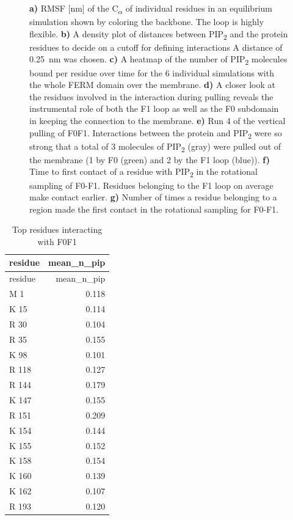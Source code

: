 \documentclass[
  twocolumn]{biophys-new-mod}
\begin{document}
\begin{figure}
\begin{minipage}[t]{0.50\linewidth}
{{}

}

\subcaption{\label{fig-f0f1-first-to-find}~}
\end{minipage}%

\caption{\label{fig-suppl}\textbf{a)} RMSF {[}nm{]} of the
C\textsubscript{\(\alpha\)} of individual residues in an equilibrium
simulation shown by coloring the backbone. The loop is highly flexible.
\textbf{b)} A density plot of distances between PIP\textsubscript{2} and
the protein residues to decide on a cutoff for defining interactions A
distance of 0.25~nm was chosen. \textbf{c)} A heatmap of the number of
PIP\textsubscript{2} molecules bound per residue over time for the 6
individual simulations with the whole FERM domain over the membrane.
\textbf{d)} A closer look at the residues involved in the interaction
during pulling reveals the instrumental role of both the F1 loop as well
as the F0 subdomain in keeping the connection to the membrane.
\textbf{e)} Run 4 of the vertical pulling of F0F1. Interactions between
the protein and PIP\textsubscript{2} were so strong that a total of 3
molecules of PIP\textsubscript{2} (gray) were pulled out of the membrane
(1 by F0 (green) and 2 by the F1 loop (blue)). \textbf{f)} Time to first
contact of a residue with PIP\textsubscript{2} in the rotational
sampling of F0-F1. Residues belonging to the F1 loop on average make
contact earlier. \textbf{g)} Number of times a residue belonging to a
region made the first contact in the rotational sampling for F0-F1.}

\end{figure}

\hypertarget{tbl-f0f1-top-interacting}{}
\begin{longtable}[]{@{}lr@{}}
\caption{\label{tbl-f0f1-top-interacting}Top residues interacting with
F0F1}\tabularnewline
\toprule()
residue & mean\_n\_pip \\
\midrule()
\endfirsthead
\toprule()
residue & mean\_n\_pip \\
\midrule()
\endhead
M 1 & 0.118 \\
K 15 & 0.114 \\
R 30 & 0.104 \\
R 35 & 0.155 \\
K 98 & 0.101 \\
R 118 & 0.127 \\
R 144 & 0.179 \\
K 147 & 0.155 \\
R 151 & 0.209 \\
K 154 & 0.144 \\
K 155 & 0.152 \\
K 158 & 0.154 \\
K 160 & 0.139 \\
K 162 & 0.107 \\
R 193 & 0.120 \\
\bottomrule()
\end{longtable}
\end{document}
